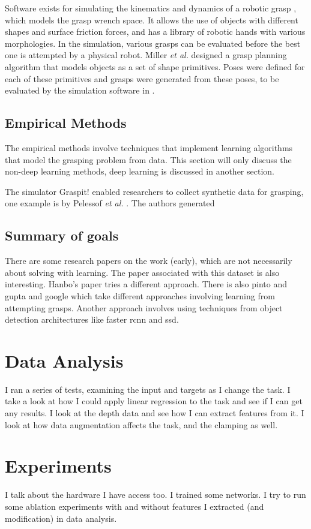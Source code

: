 \documentclass{article}
\begin{document}
Software exists for simulating the kinematics and dynamics of a robotic
grasp \cite{miller04}, which models the grasp wrench space. It allows the use
of objects with different shapes and surface friction forces, and has a library
of robotic hands with various morphologies. In the simulation, various grasps
can be evaluated before the best one is attempted by a physical robot. Miller
\textit{et al.} \cite{miller03} designed a grasp planning algorithm that
models objects as a
set of shape primitives. Poses were defined for each of
these primitives and grasps
were generated from these poses, to be evaluated by the simulation software in
\cite{miller04}.

\subsection{Empirical Methods}
The empirical methods involve techniques that implement learning algorithms that
model the grasping problem from data. This section will only discuss the
non-deep learning methods, deep learning is discussed in another section.

The simulator Graspit! \cite{miller04} enabled researchers to collect synthetic
data for grasping, one example is by Pelessof \textit{et al.} \cite{pelessof04}.
The authors generated 

\subsection{Summary of goals}
There are some research papers on the work (early), which are not necessarily
about solving with learning.
The paper associated with
this dataset is also interesting. Hanbo's paper tries a different approach.
There is also pinto and gupta and google which take different approaches
involving learning from attempting grasps. Another approach involves using
techniques from object detection architectures like faster rcnn and ssd.


\section{Data Analysis}
I ran a series of tests, examining the input and targets as I change the task.
I take a look at how I could apply linear regression to the task and see if
I can get any results. I look at the depth data and see how I can extract
features from it. I look at how data augmentation affects the task, and the
clamping as well.

\section{Experiments}
I talk about the hardware I have access too. I trained some networks. I try
to run some ablation experiments with and without features I extracted (and
modification) in data analysis.



\end{document}
